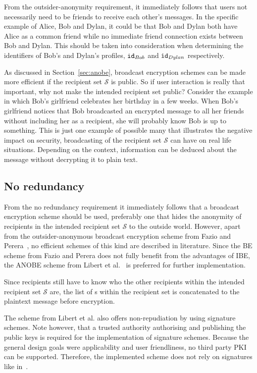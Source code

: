 From the outsider-anonymity requirement, it immediately follows that users not necessarily need to be friends to receive each other's messages. In the specific example of Alice, Bob and Dylan, it could be that Bob and Dylan both have Alice as a common friend while no immediate friend connection exists between Bob and Dylan. This should be taken into consideration when determining the identifiers of Bob's and Dylan's profiles, $\mathtt{id}_{Bob}$ and $\mathtt{id}_{Dylan}$ respectively.

As discussed in Section~\ref{sec:anobe}, broadcast encryption schemes can be made more efficient if the recipient set $\mathcal{S}$ is public. So if user interaction is really that important, why not make the intended recipient set public? Consider the example in which Bob's girlfriend celebrates her birthday in a few weeks. When Bob's girlfriend notices that Bob broadcasted an encrypted message to all her friends without including her as a recipient, she will probably know Bob is up to something. This is just one example of possible many that illustrates the negative impact on security, broadcasting of the recipient set $\mathcal{S}$ can have on real life situations. Depending on the context, information can be deduced about the message without decrypting it to plain text.

\subsection{No redundancy}
From the no redundancy requirement it immediately follows that a broadcast encryption scheme should be used, preferably one that hides the anonymity of recipients in the intended recipient set $\mathcal{S}$ to the outside world. However, apart from the outsider-anonymous broadcast encryption scheme from Fazio and Perera~\cite{art:FazioP12}, no efficient schemes of this kind are described in literature. Since the BE scheme from Fazio and Perera does not fully benefit from the advantages of IBE, the ANOBE scheme from Libert et al.~\cite{art:LibertPQ12} is preferred for further implementation.

Since recipients still have to know who the other recipients within the intended recipient set $\mathcal{S}$ are, the list of \id{}s within the recipient set is concatenated to the plaintext message before encryption.

The scheme from Libert et al. also offers non-repudiation by using signature schemes. Note however, that a trusted authority authorising and publishing the public keys is required for the implementation of signature schemes. Because the general design goals were applicability and user friendliness, no third party PKI can be supported. Therefore, the implemented scheme does not rely on signatures like in~\cite{art:LibertPQ12}.

